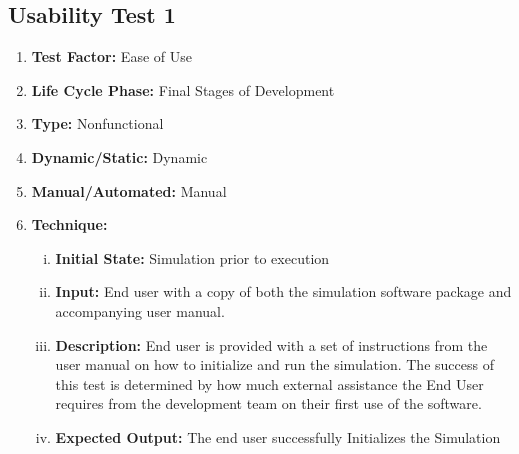\documentclass[paper=letter, fontsize=10pt]{scrartcl}
\numberwithin{equation}{section}		%
\numberwithin{figure}{section}			%
\numberwithin{table}{section}				%
\begin{document}
\subsection{Usability Test 1}
\begin{enumerate}[]
	\item \textbf{Test Factor:} Ease of Use
	\item \textbf{Life Cycle Phase:} Final Stages of Development
	\item \textbf{Type:} Nonfunctional
	\item \textbf{Dynamic/Static:} Dynamic
	\item \textbf{Manual/Automated:} Manual
	\item \textbf{Technique:}
		\begin{enumerate}[(i)]
			\item \textbf{Initial State:} Simulation prior to execution  
			\item \textbf{Input:} End user with a copy of both the simulation software package and accompanying user manual.
			\item \textbf{Description:} End user is provided with a set of instructions from the user manual on how to initialize and run the simulation. The success of this test is determined by how much external assistance the End User requires from the development team on their first use of the software. 
			\item \textbf{Expected Output:} The end user successfully Initializes the Simulation
		\end{enumerate}
\end{enumerate}
\end{document}
